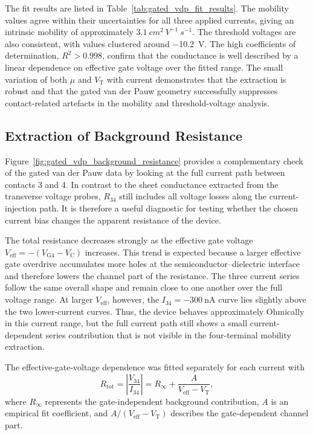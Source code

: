 The fit results are listed in Table~\ref{tab:gated_vdp_fit_results}. The mobility values agree within their uncertainties for all three applied currents, giving an intrinsic mobility of approximately $3.1~\si{cm^2~V^{-1}~s^{-1}}$. The threshold voltages are also consistent, with values clustered around \SI{-10.2}{\volt}. The high coefficients of determination, $R^2>0.998$, confirm that the conductance is well described by a linear dependence on effective gate voltage over the fitted range. The small variation of both $\mu$ and $V_\text{T}$ with current demonstrates that the extraction is robust and that the gated van der Pauw geometry successfully suppresses contact-related artefacts in the mobility and threshold-voltage analysis. 




\subsection{Extraction of Background Resistance}

Figure~\ref{fig:gated_vdp_background_resistance} provides a complementary
check of the gated van der Pauw data by looking at the full current path between
contacts 3 and 4. In contrast to the sheet conductance extracted from the
transverse voltage probes, $R_{34}$ still includes all voltage losses along the
current-injection path. It is therefore a useful diagnostic for testing whether
the chosen current bias changes the apparent resistance of the device.

The total resistance decreases strongly as the effective gate voltage
$V_\mathrm{eff}=-(V_\mathrm{G4}-V_\mathrm{C})$ increases. This trend is expected
because a larger effective gate overdrive accumulates more holes at the
semiconductor--dielectric interface and therefore lowers the channel part of the
resistance. The three current series follow the same overall shape and remain
close to one another over the full voltage range. At larger $V_\mathrm{eff}$,
however, the $I_{34}=\SI{-300}{\nano\ampere}$ curve lies slightly above the two
lower-current curves. Thus, the device behaves approximately Ohmically in this
current range, but the full current path still shows a small current-dependent
series contribution that is not visible in the four-terminal mobility extraction.

The effective-gate-voltage dependence was fitted separately for each current
with
\begin{equation}
    R_\mathrm{tot}=\left|\frac{V_{34}}{I_{34}}\right|
    =R_\infty+\frac{A}{V_\mathrm{eff}-V_\mathrm{T}},
    \label{eq:gated_vdp_background_fit}
\end{equation}
where $R_\infty$ represents the gate-independent background contribution,
$A$ is an empirical fit coefficient, and
$A/(V_\mathrm{eff}-V_\mathrm{T})$ describes the gate-dependent channel part.

